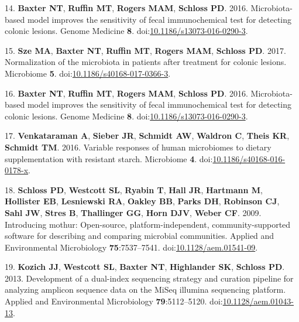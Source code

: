 \documentclass[11pt,]{article}
\begin{document}
\hypertarget{ref-Baxter2016}{}
14. \textbf{Baxter NT}, \textbf{Ruffin MT}, \textbf{Rogers MAM},
\textbf{Schloss PD}. 2016. Microbiota-based model improves the
sensitivity of fecal immunochemical test for detecting colonic lesions.
Genome Medicine \textbf{8}.
doi:\href{https://doi.org/10.1186/s13073-016-0290-3}{10.1186/s13073-016-0290-3}.

\hypertarget{ref-normalization_sze2017}{}
15. \textbf{Sze MA}, \textbf{Baxter NT}, \textbf{Ruffin MT},
\textbf{Rogers MAM}, \textbf{Schloss PD}. 2017. Normalization of the
microbiota in patients after treatment for colonic lesions. Microbiome
\textbf{5}.
doi:\href{https://doi.org/10.1186/s40168-017-0366-3}{10.1186/s40168-017-0366-3}.

\hypertarget{ref-crc_model_baxter2016}{}
16. \textbf{Baxter NT}, \textbf{Ruffin MT}, \textbf{Rogers MAM},
\textbf{Schloss PD}. 2016. Microbiota-based model improves the
sensitivity of fecal immunochemical test for detecting colonic lesions.
Genome Medicine \textbf{8}.
doi:\href{https://doi.org/10.1186/s13073-016-0290-3}{10.1186/s13073-016-0290-3}.

\hypertarget{ref-scfa_measures_venkataraman2016}{}
17. \textbf{Venkataraman A}, \textbf{Sieber JR}, \textbf{Schmidt AW},
\textbf{Waldron C}, \textbf{Theis KR}, \textbf{Schmidt TM}. 2016.
Variable responses of human microbiomes to dietary supplementation with
resistant starch. Microbiome \textbf{4}.
doi:\href{https://doi.org/10.1186/s40168-016-0178-x}{10.1186/s40168-016-0178-x}.

\hypertarget{ref-Schloss2009}{}
18. \textbf{Schloss PD}, \textbf{Westcott SL}, \textbf{Ryabin T},
\textbf{Hall JR}, \textbf{Hartmann M}, \textbf{Hollister EB},
\textbf{Lesniewski RA}, \textbf{Oakley BB}, \textbf{Parks DH},
\textbf{Robinson CJ}, \textbf{Sahl JW}, \textbf{Stres B},
\textbf{Thallinger GG}, \textbf{Horn DJV}, \textbf{Weber CF}. 2009.
Introducing mothur: Open-source, platform-independent,
community-supported software for describing and comparing microbial
communities. Applied and Environmental Microbiology
\textbf{75}:7537--7541.
doi:\href{https://doi.org/10.1128/aem.01541-09}{10.1128/aem.01541-09}.

\hypertarget{ref-Kozich2013}{}
19. \textbf{Kozich JJ}, \textbf{Westcott SL}, \textbf{Baxter NT},
\textbf{Highlander SK}, \textbf{Schloss PD}. 2013. Development of a
dual-index sequencing strategy and curation pipeline for analyzing
amplicon sequence data on the MiSeq illumina sequencing platform.
Applied and Environmental Microbiology \textbf{79}:5112--5120.
doi:\href{https://doi.org/10.1128/aem.01043-13}{10.1128/aem.01043-13}.
\end{document}
